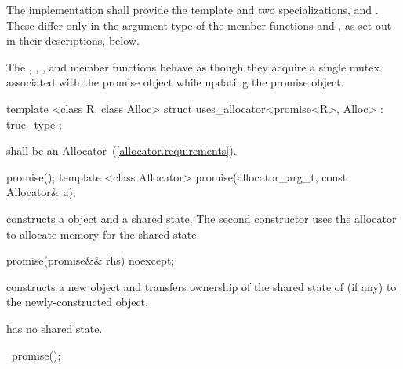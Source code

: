 \pnum
The implementation shall provide the template  and two specializations,
 and . These differ only in the argument type
of the member functions  and ,
as set out in their descriptions, below.

\pnum
The , , ,
and  member functions behave as though
they acquire a single mutex associated with the promise object while updating the
promise object.

%
\begin{itemdecl}
template <class R, class Alloc>
  struct uses_allocator<promise<R>, Alloc>
    : true_type { };
\end{itemdecl}

\begin{itemdescr}
\pnum
\requires {} shall be an Allocator~(\ref{allocator.requirements}).
\end{itemdescr}


%
\begin{itemdecl}
promise();
template <class Allocator>
  promise(allocator_arg_t, const Allocator& a);
\end{itemdecl}

\begin{itemdescr}
\pnum
\effects constructs a  object and a shared state. The second
constructor uses the allocator  to allocate memory for the shared
state.
\end{itemdescr}

%
\begin{itemdecl}
promise(promise&& rhs) noexcept;
\end{itemdecl}

\begin{itemdescr}
\pnum
\effects constructs a new  object and transfers ownership of the shared state
of  (if any) to the newly-constructed object.

\pnum
\postcondition {} has no shared state.
\end{itemdescr}

%
\begin{itemdecl}
~promise();
\end{itemdecl}

